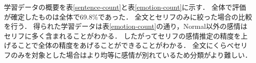 \begin{table}[ht]
 \centering
  \caption{学習データ(感情別)}
  \vspace{0.3\baselineskip}
  \label{emotion-count}
\end{table}

学習データの概要を表\ref{sentence-count}と表\ref{emotion-count}に示す．
全体で評価が確定したものは全体で69.8\%であった．
全文とセリフのみに絞った場合の比較を行う．
得られた学習データは表\ref{emotion-count}の通り，Normal以外の感情はセリフに多く含まれることがわかる．
したがってセリフの感情推定の精度を上げることで全体の精度をあげることができることがわかる．
全文にくらべセリフのみを対象とした場合はより均等に感情が別れているため分類がより難しい．


